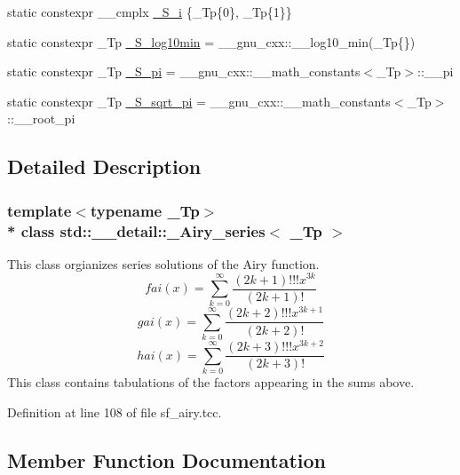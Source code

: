 \begin{DoxyCompactItemize}
\item 
static constexpr \+\_\+\+\_\+cmplx \hyperlink{classstd_1_1____detail_1_1__Airy__series_a4133b308af0c967a73c918af22c93b09}{\+\_\+\+S\+\_\+i} \{\+\_\+\+Tp\{0\}, \+\_\+\+Tp\{1\}\}
\item 
static constexpr \+\_\+\+Tp \hyperlink{classstd_1_1____detail_1_1__Airy__series_a57bb7eedba6245beb6be7e84b82d405c}{\+\_\+\+S\+\_\+log10min} = \+\_\+\+\_\+gnu\+\_\+cxx\+::\+\_\+\+\_\+log10\+\_\+min(\+\_\+\+Tp\{\})
\item 
static constexpr \+\_\+\+Tp \hyperlink{classstd_1_1____detail_1_1__Airy__series_a9de354dae47d41acc60824681d864184}{\+\_\+\+S\+\_\+pi} = \+\_\+\+\_\+gnu\+\_\+cxx\+::\+\_\+\+\_\+math\+\_\+constants$<$\+\_\+\+Tp$>$\+::\+\_\+\+\_\+pi
\item 
static constexpr \+\_\+\+Tp \hyperlink{classstd_1_1____detail_1_1__Airy__series_a3fd1fba37ef8beb0d89854d4e58b8a38}{\+\_\+\+S\+\_\+sqrt\+\_\+pi} = \+\_\+\+\_\+gnu\+\_\+cxx\+::\+\_\+\+\_\+math\+\_\+constants$<$\+\_\+\+Tp$>$\+::\+\_\+\+\_\+root\+\_\+pi
\end{DoxyCompactItemize}


\subsection{Detailed Description}
\subsubsection*{template$<$typename \+\_\+\+Tp$>$\\*
class std\+::\+\_\+\+\_\+detail\+::\+\_\+\+Airy\+\_\+series$<$ \+\_\+\+Tp $>$}

This class orgianizes series solutions of the Airy function. \[ fai(x) = \sum_{k=0}^\infty \frac{(2k+1)!!!x^{3k}}{(2k+1)!} \] \[ gai(x) = \sum_{k=0}^\infty \frac{(2k+2)!!!x^{3k+1}}{(2k+2)!} \] \[ hai(x) = \sum_{k=0}^\infty \frac{(2k+3)!!!x^{3k+2}}{(2k+3)!} \] This class contains tabulations of the factors appearing in the sums above. 

Definition at line 108 of file sf\+\_\+airy.\+tcc.



\subsection{Member Function Documentation}

